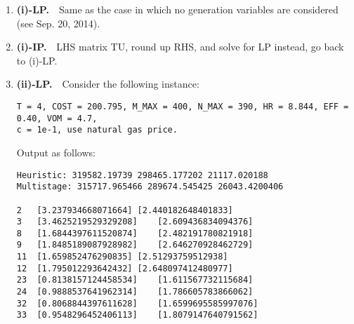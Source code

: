 \documentclass[10pt]{article}
\theoremstyle{plain}
\theoremstyle{definition}
\theoremstyle{remark}
\begin{document}
\begin{enumerate}
\item {\bf (i)-LP.}~~Same as the case in which no generation variables are considered (see Sep. 20, 2014).
\item {\bf (i)-IP.}~~LHS matrix TU, round up RHS, and solve for LP instead, go back to (i)-LP.
\item {\bf (ii)-LP.}~~Consider the following instance:
\begin{verbatim}
T = 4, COST = 200.795, M_MAX = 400, N_MAX = 390, HR = 8.844, EFF = 0.40, VOM = 4.7,
c = 1e-1, use natural gas price.
\end{verbatim}
Output as follows:

\begin{minipage}[t]{5.5cm}
\tiny\begin{verbatim}
Heuristic: 319582.19739 298465.177202 21117.020188
Multistage: 315717.965466 289674.545425 26043.4200406

2	[3.237934668071664]	[2.440182648401833]
3	[3.4625219529329208]	[2.609436834094376]
8	[1.6844397611520874]	[2.482191780821918]
9	[1.8485189087928982]	[2.646270928462729]
11	[1.659852476290835]	[2.51293759512938]
12	[1.795012293642432]	[2.648097412480977]
23	[0.8138157124458534]	[1.611567732115684]
24	[0.9888537641962314]	[1.786605783866062]
32	[0.8068844397611628]	[1.6599695585997076]
33	[0.9548296452406113]	[1.8079147640791562]


\end{verbatim}
\end{minipage}
\end{enumerate}
\end{document}
